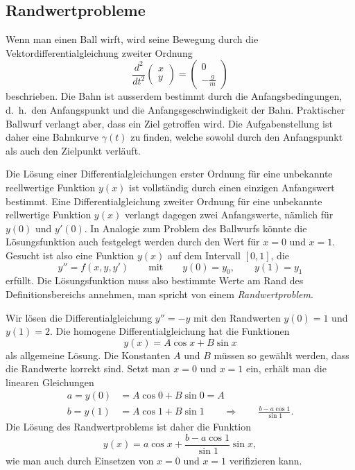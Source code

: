 \subsection{Randwertprobleme\label{section:randwertprobleme}}
Wenn man einen Ball wirft, wird seine Bewegung durch die
Vektordifferentialgleichung zweiter Ordnung
\[
\frac{d^2}{dt^2}\begin{pmatrix}x\\y\end{pmatrix}
=
\begin{pmatrix}0\\\displaystyle-\frac{g}{m}\end{pmatrix}
\]
beschrieben.
Die Bahn ist ausserdem bestimmt durch die Anfangsbedingungen,
d.~h.~den Anfangspunkt und die Anfangsgeschwindigkeit der Bahn.
Praktischer Ballwurf verlangt aber, dass ein Ziel getroffen wird.
Die Aufgabenstellung ist daher eine Bahnkurve $\gamma(t)$ zu finden,
welche sowohl durch den Anfangspunkt als auch den Zielpunkt
verläuft.

Die Lösung einer Differentialgleichungen erster Ordnung für eine
unbekannte reellwertige Funktion $y(x)$ ist vollständig durch einen
einzigen Anfangswert bestimmt.
Eine Differentialgleichung zweiter Ordnung für eine unbekannte
rellwertige Funktion $y(x)$ verlangt dagegen zwei Anfangswerte,
nämlich für $y(0)$ und $y'(0)$.
In Analogie zum Problem des Ballwurfs könnte die Lösungsfunktion auch
festgelegt werden durch den Wert für $x=0$ und $x=1$.
Gesucht ist also eine Funktion $y(x)$ auf dem Intervall $[0,1]$, die
\begin{equation}
y''=f(x,y,y')
\qquad\text{mit}\qquad
y(0)=y_0,
\qquad
y(1)=y_1
\end{equation}
erfüllt.
Die Lösungsfunktion muss also bestimmte Werte am Rand des Definitionsbereichs
annehmen, man spricht von einem {\em Randwertproblem}.
%

\begin{beispiel}
Wir lösen die Differentialgleichung $y''=-y$ mit den Randwerten
$y(0)=1$ und $y(1)=2$.
Die homogene Differentialgleichung hat die Funktionen
\[
y(x)=A \cos x + B\sin x
\]
als allgemeine Lösung.
Die Konstanten $A$ und $B$ müssen so gewählt werden, dass die Randwerte
korrekt sind.
Setzt man $x=0$ und $x=1$ ein, erhält man die linearen Gleichungen
\begin{align*}
a=y(0)&=A\cos 0 + B\sin 0=A\\
b=y(1)&=A\cos 1 + B\sin 1
\qquad\Rightarrow\qquad
\frac{b-a\cos 1}{\sin 1}.
\end{align*}
Die Lösung des Randwertproblems ist daher die Funktion
\[
y(x)=a\cos x +\frac{b-a\cos 1}{\sin 1}\sin x,
\]
wie man auch durch Einsetzen von $x=0$ und $x=1$ verifizieren kann.
\end{beispiel}

